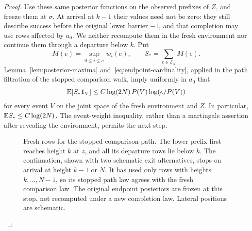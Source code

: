 \begin{proof}
Use these same posterior functions on the observed prefixes of $Z$, and
freeze them at $\sigma$.  At arrival at $k-1$ their values need not be
zero: they still describe success before the original lower barrier
$-1$, and that completion may use rows affected by $a_0$.  We neither
recompute them in the fresh environment nor continue them through a
departure below $k$.  Put
\[
 M(e)=\sup_{0\le i\le\sigma}w_i(e),\qquad
 S_*=\sum_{e\in\mathcal E_N}M(e).
\]
Lemma~\ref{lem:posterior-maxima}
and~\eqref{eq:endpoint-cardinality}, applied in the path filtration of
the stopped comparison walk, imply uniformly in $a_0$ that
\begin{equation}\label{eq:comparison-event-weight}
 \mathbb E[S_*\mathbf 1_V]
 \le C\log(2N)\,P(V)\log(e/P(V))
\end{equation}
for every event $V$ on the joint space of the fresh environment and $Z$.
In particular, $\mathbb E S_*\le C\log(2N)$.  The event-weight inequality,
rather than a martingale assertion after revealing the environment,
permits the next step.

\begin{figure}[tbp]
 \centering
 
 \caption{Fresh rows for the stopped comparison path. The lower prefix
 first reaches height $k$ at $z$, and all its departure rows lie below
 $k$. The continuation, shown with two schematic exit alternatives,
 stops on arrival at height $k-1$ or $N$. It has used only rows with
 heights $k,\ldots,N-1$, so its stopped path law agrees with the fresh
 comparison law. The original endpoint posteriors are frozen at this
 stop, not recomputed under a new completion law. Lateral positions
 are schematic.}
 \label{fig:fresh-strip}
\end{figure}


\end{proof}

